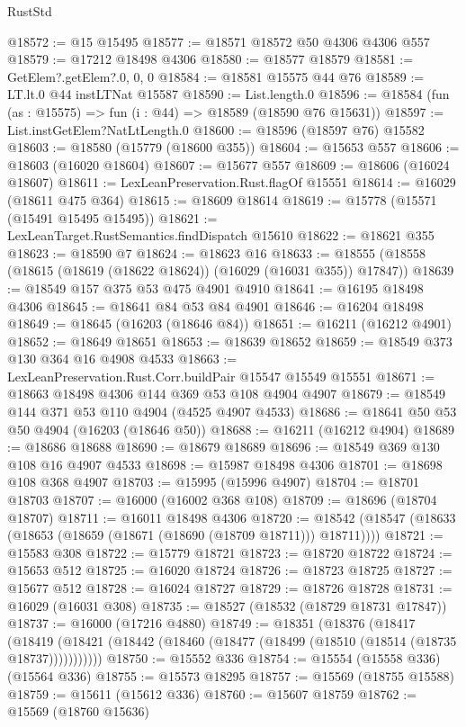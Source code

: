 \begin{lexlean}{RustStd}
\begin{coremodule}
@18572 := @15 @15495
@18577 := @18571 @18572 @50 @4306 @4306 @557
@18579 := @17212 @18498 @4306
@18580 := @18577 @18579
@18581 := GetElem?.getElem?.{0, 0, 0}
@18584 := @18581 @15575 @44 @76
@18589 := LT.lt.{0} @44 instLTNat @15587
@18590 := List.length.{0}
@18596 := @18584 (fun (as : @15575) => fun (i : @44) => @18589 (@18590 @76 @15631))
@18597 := List.instGetElem?NatLtLength.{0}
@18600 := @18596 (@18597 @76) @15582
@18603 := @18580 (@15779 (@18600 @355))
@18604 := @15653 @557
@18606 := @18603 (@16020 @18604)
@18607 := @15677 @557
@18609 := @18606 (@16024 @18607)
@18611 := LexLeanPreservation.Rust.flagOf @15551
@18614 := @16029 (@18611 @475 @364)
@18615 := @18609 @18614
@18619 := @15778 (@15571 (@15491 @15495 @15495))
@18621 := LexLeanTarget.RustSemantics.findDispatch @15610
@18622 := @18621 @355
@18623 := @18590 @7
@18624 := @18623 @16
@18633 := @18555 (@18558 (@18615 (@18619 (@18622 @18624)) (@16029 (@16031 @355)) @17847))
@18639 := @18549 @157 @375 @53 @475 @4901 @4910
@18641 := @16195 @18498 @4306
@18645 := @18641 @84 @53 @84 @4901
@18646 := @16204 @18498
@18649 := @18645 (@16203 (@18646 @84))
@18651 := @16211 (@16212 @4901)
@18652 := @18649 @18651
@18653 := @18639 @18652
@18659 := @18549 @373 @130 @364 @16 @4908 @4533
@18663 := LexLeanPreservation.Rust.Corr.buildPair @15547 @15549 @15551
@18671 := @18663 @18498 @4306 @144 @369 @53 @108 @4904 @4907
@18679 := @18549 @144 @371 @53 @110 @4904 (@4525 @4907 @4533)
@18686 := @18641 @50 @53 @50 @4904 (@16203 (@18646 @50))
@18688 := @16211 (@16212 @4904)
@18689 := @18686 @18688
@18690 := @18679 @18689
@18696 := @18549 @369 @130 @108 @16 @4907 @4533
@18698 := @15987 @18498 @4306
@18701 := @18698 @108 @368 @4907
@18703 := @15995 (@15996 @4907)
@18704 := @18701 @18703
@18707 := @16000 (@16002 @368 @108)
@18709 := @18696 (@18704 @18707)
@18711 := @16011 @18498 @4306
@18720 := @18542 (@18547 (@18633 (@18653 (@18659 (@18671 (@18690 (@18709 @18711))) @18711))))
@18721 := @15583 @308
@18722 := @15779 @18721
@18723 := @18720 @18722
@18724 := @15653 @512
@18725 := @16020 @18724
@18726 := @18723 @18725
@18727 := @15677 @512
@18728 := @16024 @18727
@18729 := @18726 @18728
@18731 := @16029 (@16031 @308)
@18735 := @18527 (@18532 (@18729 @18731 @17847))
@18737 := @16000 (@17216 @4880)
@18749 := @18351
    (@18376
      (@18417
        (@18419 (@18421 (@18442 (@18460 (@18477 (@18499 (@18510 (@18514 (@18735 @18737)))))))))))
@18750 := @15552 @336
@18754 := @15554 (@15558 @336) (@15564 @336)
@18755 := @15573 @18295
@18757 := @15569 (@18755 @15588)
@18759 := @15611 (@15612 @336)
@18760 := @15607 @18759
@18762 := @15569 (@18760 @15636)

\end{coremodule}
\end{lexlean}
